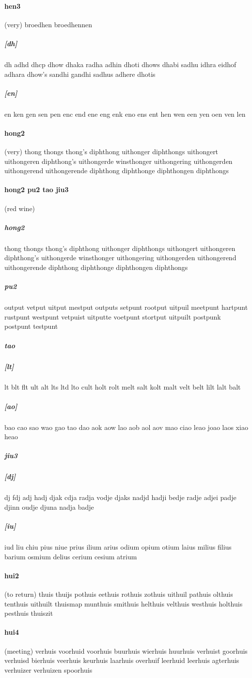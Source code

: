 \documentclass{article}
\begin{document}
\paragraph{hen3}(very) broedhen
broedhennen
\subparagraph{[dh]}dh
adhd
dhcp
dhow
dhaka
radha
adhin
dhoti
dhows
dhabi
sadhu
idhra
eidhof
adhara
dhow's
sandhi
gandhi
sadhus
adhere
dhotis
\subparagraph{[en]}en
ken
gen
sen
pen
enc
end
ene
eng
enk
eno
ens
ent
hen
wen
een
yen
oen
ven
len
\paragraph{hong2}(very) thong
thongs
thong's
diphthong
uithonger
diphthongs
uithongert
uithongeren
diphthong's
uithongerde
winsthonger
uithongering
uithongerden
uithongerend
uithongerende
diphthong diphthonge diphthongen diphthongs
\paragraph{hong2 pu2 tao jiu3}(red wine) \subparagraph{hong2}thong
thongs
thong's
diphthong
uithonger
diphthongs
uithongert
uithongeren
diphthong's
uithongerde
winsthonger
uithongering
uithongerden
uithongerend
uithongerende
diphthong diphthonge diphthongen diphthongs
\subparagraph{pu2}output
vetput
uitput
mestput
outputs
setpunt
rootput
uitpuil
meetpunt
hartpunt
rustpunt
westpunt
vetpuist
uitputte
voetpunt
stortput
uitpuilt
postpunk
postpunt
testpunt
\subparagraph{tao}\subparagraph{[lt]}lt
blt
flt
ult
alt
lts
ltd
lto
cult
holt
rolt
melt
salt
kolt
malt
velt
belt
lilt
lalt
balt
\subparagraph{[ao]}bao
cao
sao
wao
gao
tao
dao
aok
aow
lao
aob
aol
aov
mao
ciao
leao
joao
laos
xiao
heao
\subparagraph{jiu3}\subparagraph{[dj]}dj
fdj
adj
hadj
djak
cdja
radja
vodje
djaks
nadjd
hadji
bedje
radje
adjei
padje
djinn
oudje
djuna
nadja
badje
\subparagraph{[iu]}iud
liu
chiu
pius
niue
prius
ilium
arius
odium
opium
otium
laius
milius
filius
barium
osmium
delius
cerium
cesium
atrium
\paragraph{hui2}(to return) thuis
thuijs
pothuis
eethuis
rothuis
zothuis
uithuil
pathuis
olthuis
tenthuis
uithuilt
thuismap
munthuis
smithuis
helthuis
velthuis
westhuis
holthuis
pesthuis
thuiszit
\paragraph{hui4}(meeting) verhuis
voorhuid
voorhuis
buurhuis
wierhuis
huurhuis
verhuist
goorhuis
verhuisd
bierhuis
veerhuis
keurhuis
laarhuis
overhuif
leerhuid
leerhuis
agterhuis
verhuizer
verhuizen
spoorhuis
\end{document}

